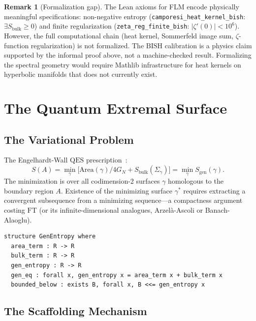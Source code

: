 \documentclass[11pt,a4paper]{article}
\theoremstyle{plain}
\theoremstyle{definition}
\newtheorem{remark}[theorem]{Remark}
\newcommand{\BISH}{\ensuremath{\mathrm{BISH}}}
\newcommand{\FT}{\ensuremath{\mathrm{FT}}}
\newcommand{\QES}{\ensuremath{\mathrm{QES}}}
\newcommand{\GN}{\ensuremath{G_N}}
\begin{document}
\begin{remark}[Formalization gap]\label{rem:flm-gap}
The Lean axioms for FLM encode physically meaningful specifications:
non-negative entropy (\texttt{camporesi\_heat\_kernel\_bish}:
$\exists S_{\text{bulk}} \ge 0$) and finite regularization
(\texttt{zeta\_reg\_finite\_bish}: $|\zeta'(0)| < 10^6$).
However, the full computational chain (heat kernel, Sommerfeld image
sum, $\zeta$-function regularization) is not formalized.
The $\BISH$ calibration is a physics claim supported by the informal
proof above, not a machine-checked result.  Formalizing the spectral
geometry would require Mathlib infrastructure for heat kernels on
hyperbolic manifolds that does not currently exist.
\end{remark}

\section{The Quantum Extremal Surface}\label{sec:qes}

\subsection{The Variational Problem}

The Engelhardt-Wall $\QES$ prescription~\cite{EW2015}:
\[
  S(A) = \min_\gamma \bigl[\mathrm{Area}(\gamma)/4\GN
    + S_{\mathrm{bulk}}(\Sigma_\gamma)\bigr]
    = \min_\gamma S_{\mathrm{gen}}(\gamma).
\]
The minimization is over all codimension-2 surfaces $\gamma$ homologous
to the boundary region $A$.  Existence of the minimizing surface
$\gamma^*$ requires extracting a convergent subsequence from a
minimizing sequence---a compactness argument costing $\FT$ (or its
infinite-dimensional analogues, Arzel\`a-Ascoli or Banach-Alaoglu).

\begin{lstlisting}[caption={Generalized entropy structure: \texttt{Defs.lean}}]
structure GenEntropy where
  area_term : R -> R
  bulk_term : R -> R
  gen_entropy : R -> R
  gen_eq : forall x, gen_entropy x = area_term x + bulk_term x
  bounded_below : exists B, forall x, B <<= gen_entropy x
\end{lstlisting}

\subsection{The Scaffolding Mechanism}\label{sec:scaffold}
\end{document}
